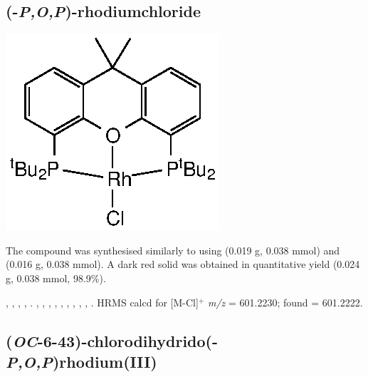 
\subsection*{(\tBuXantphosk-\emph{P,O,P})-rhodiumchloride}

\begin{structure}[h]
\begin{center}
\includegraphics{../Structures/RhCl(CtBu).eps}
\end{center}
\end{structure}

The compound was synthesised similarly to \ce{[Rh(\tBusixantphos)Cl]} using \tBuxantphos{} (0.019 g, 0.038 mmol) and  (0.016 g, 0.038 mmol).  A dark red solid was obtained in quantitative yield (0.024 g, 0.038 mmol, 98.9\%).  

,
,
,
,
.
,
,
,
,
,
,
,
,
,
.
HRMS calcd for  [M-Cl]$^+$ \emph{m/z} = 601.2230; found = 601.2222.



\subsection*{(\emph{OC}-6-43)-chlorodihydrido(\tBusixantphosk-\emph{P,O,P})rhodium(III)}

